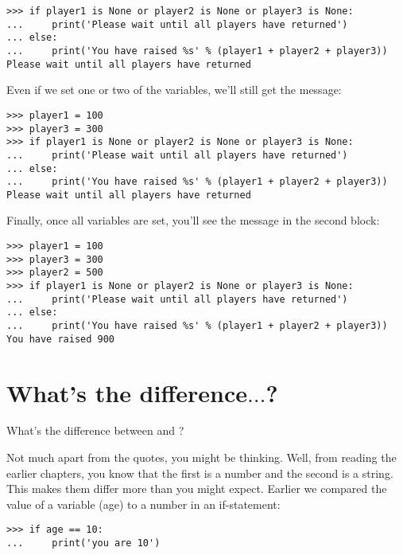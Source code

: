 \begin{listing}
\begin{verbatim}
>>> if player1 is None or player2 is None or player3 is None:
...     print('Please wait until all players have returned')
... else:
...     print('You have raised %s' % (player1 + player2 + player3))
Please wait until all players have returned
\end{verbatim}
\end{listing}

Even if we set one or two of the variables, we'll still get the message:

\begin{listing}
\begin{verbatim}
>>> player1 = 100
>>> player3 = 300
>>> if player1 is None or player2 is None or player3 is None:
...     print('Please wait until all players have returned')
... else:
...     print('You have raised %s' % (player1 + player2 + player3))
Please wait until all players have returned
\end{verbatim}
\end{listing}

\noindent
Finally, once all variables are set, you'll see the message in the second block:

\begin{listing}
\begin{verbatim}
>>> player1 = 100
>>> player3 = 300
>>> player2 = 500
>>> if player1 is None or player2 is None or player3 is None:
...     print('Please wait until all players have returned')
... else:
...     print('You have raised %s' % (player1 + player2 + player3))
You have raised 900
\end{verbatim}
\end{listing}

\section{What's the difference$\ldots$?}\label{whatsthedifference}

What's the difference between  and ?
\par
Not much apart from the quotes, you might be thinking.  Well, from reading the earlier chapters, you know that the first is a number and the second is a string. This makes them differ more than you might expect.  Earlier we compared the value of a variable (age) to a number in an if-statement:

\begin{listing}
\begin{verbatim}
>>> if age == 10:
...     print('you are 10')
\end{verbatim}
\end{listing}

